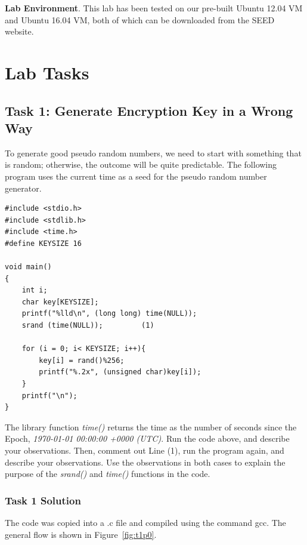 \documentclass[12pt]{article}
\begin{document}
\textbf{Lab Environment}. This lab has been tested on our pre-built Ubuntu 12.04 VM and Ubuntu 16.04 VM, both of which
can be downloaded from the SEED website.

\clearpage

\section{Lab Tasks}
\subsection{Task 1: Generate Encryption Key in a Wrong Way}
To generate good pseudo random numbers, we need to start with something that is random; otherwise, the
outcome will be quite predictable. The following program uses the current time as a seed for the pseudo
random number generator.

\begin{verbatim}
#include <stdio.h>
#include <stdlib.h>
#include <time.h>
#define KEYSIZE 16

void main()
{
    int i;
    char key[KEYSIZE];
    printf("%lld\n", (long long) time(NULL));
    srand (time(NULL));         (1)
    
    for (i = 0; i< KEYSIZE; i++){
        key[i] = rand()%256;
        printf("%.2x", (unsigned char)key[i]);
    }
    printf("\n");
}

\end{verbatim}

The library function \emph{time()} returns the time as the number of seconds since the Epoch, \emph{1970-01-01
00:00:00 +0000 (UTC)}. Run the code above, and describe your observations. Then, comment out
Line (1), run the program again, and describe your observations. Use the observations in both cases to
explain the purpose of the \emph{srand()} and \emph{time()} functions in the code.

\subsubsection{Task 1 Solution}

The code was copied into a .c file and compiled using the command gcc. The general flow is shown in Figure~\ref{fig:t1p0}.
\end{document}
